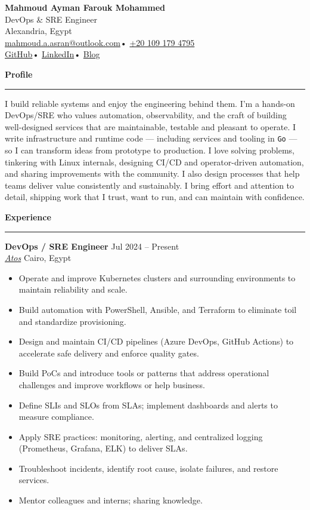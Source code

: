 \documentclass[11pt]{article}
\newcommand{\cvsection}[1]{%
  \vspace{6pt}%
  {\large\bfseries\textcolor{accent}{#1}}\\[-4pt]%
  \textcolor{accent}{\rule{\linewidth}{0.6pt}}%
  \vspace{6pt}%
}
\newcommand{\cventry}[5]{%
  {\textbf{#2}} \hfill {\small\textcolor{muted}{#1}}\\
  {\small\itshape #3} \hfill {\small\textcolor{muted}{#4}}\\[-6pt]
  #5
  \vspace{6pt}
}
\begin{document}
\begin{center}
	{\Huge\bfseries Mahmoud Ayman Farouk Mohammed} \\[6pt]
	{\large\textcolor{accent}{DevOps \& SRE Engineer}} \\[8pt]
	Alexandria, Egypt \\[6pt]

	\href{mailto:mahmoud.a.asran@outlook.com}{mahmoud.a.asran@outlook.com}\quad • \quad
	\href{tel:+201091794795}{+20 109 179 4795} \\[6pt]

	\href{https://github.com/mahmoudk1000}{GitHub}\quad • \quad
	\href{https://www.linkedin.com/in/mahmoudk1000}{LinkedIn}\quad • \quad
	\href{https://mahmoudk1000.github.io/}{Blog}
\end{center}

\vspace{8pt}

\cvsection{Profile}
I build reliable systems and enjoy the engineering behind them. I’m a hands-on DevOps/SRE who values automation, observability, and the craft of building well-designed services that are maintainable, testable and pleasant to operate. I write infrastructure and runtime code — including services and tooling in \texttt{Go} — so I can transform ideas from prototype to production. I love solving problems, tinkering with Linux internals, designing CI/CD and operator-driven automation, and sharing improvements with the community. I also design processes that help teams deliver value consistently and sustainably. I bring effort and attention to detail, shipping work that I trust, want to run, and can maintain with confidence.

\cvsection{Experience}

\cventry{Jul 2024 -- Present}{DevOps / SRE Engineer}{\href{https://atos.net}{Atos}}{Cairo, Egypt}{%
	\begin{itemize}
		\item Operate and improve Kubernetes clusters and surrounding environments to maintain reliability and scale.
		\item Build automation with PowerShell, Ansible, and Terraform to eliminate toil and standardize provisioning.
		\item Design and maintain CI/CD pipelines (Azure DevOps, GitHub Actions) to accelerate safe delivery and enforce quality gates.
		\item Build PoCs and introduce tools or patterns that address operational challenges and improve workflows or help business.
		\item Define SLIs and SLOs from SLAs; implement dashboards and alerts to measure compliance.
		\item Apply SRE practices: monitoring, alerting, and centralized logging (Prometheus, Grafana, ELK) to deliver SLAs.
		\item Troubleshoot incidents, identify root cause, isolate failures, and restore services.
		\item Mentor colleagues and interns; sharing knowledge.
	\end{itemize}
}
\end{document}
